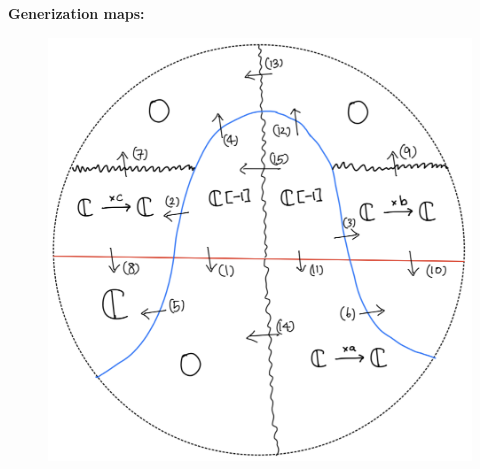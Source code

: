 \textbf{Generization maps:}
\begin{figure}[H]
    \centering
    \includegraphics[scale = 0.45]{diagrams/cobord'2/29.png} 
    \caption{}
    \label{fig:your-label}
\end{figure}

